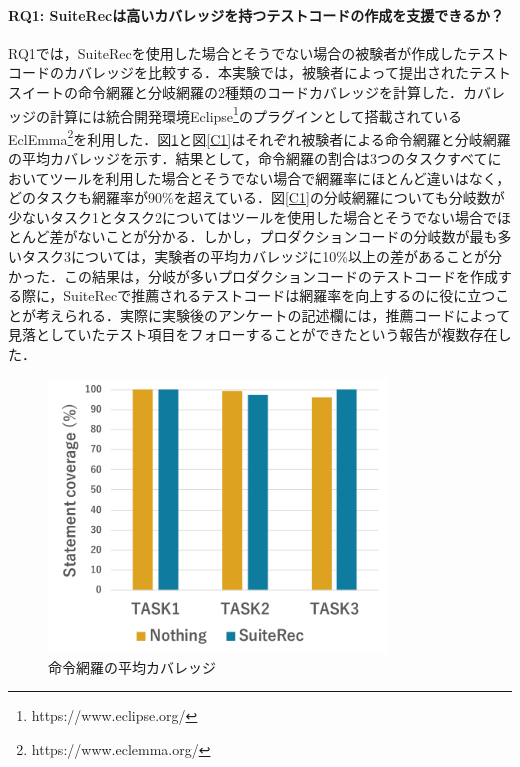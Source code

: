 \documentclass[12pt]{jarticle} %
\begin{document}
\paragraph{RQ1: {\sf SuiteRec}は高いカバレッジを持つテストコードの作成を支援できるか？}RQ1では，{\sf SuiteRec}を使用した場合とそうでない場合の被験者が作成したテストコードのカバレッジを比較する．本実験では，被験者によって提出されたテストスイートの命令網羅と分岐網羅の2種類のコードカバレッジを計算した．カバレッジの計算には統合開発環境Eclipse\footnote{https://www.eclipse.org/}のプラグインとして搭載されているEclEmma\footnote{https://www.eclemma.org/}を利用した．図\ref{C0}と図\ref{C1}はそれぞれ被験者による命令網羅と分岐網羅の平均カバレッジを示す．結果として，命令網羅の割合は3つのタスクすべてにおいてツールを利用した場合とそうでない場合で網羅率にほとんど違いはなく，どのタスクも網羅率が90\%を超えている．図\ref{C1}の分岐網羅についても分岐数が少ないタスク1とタスク2についてはツールを使用した場合とそうでない場合でほとんど差がないことが分かる．しかし，プロダクションコードの分岐数が最も多いタスク3については，実験者の平均カバレッジに10\%以上の差があることが分かった．この結果は，分岐が多いプロダクションコードのテストコードを作成する際に，{\sf SuiteRec}で推薦されるテストコードは網羅率を向上するのに役に立つことが考えられる．実際に実験後のアンケートの記述欄には，推薦コードによって見落としていたテスト項目をフォローすることができたという報告が複数存在した．

\begin{figure}[htbp]
  \begin{center}
   \includegraphics[width=9cm]{C0.pdf}
  \caption{命令網羅の平均カバレッジ}
  \label{C0}
  \end{center}
\end{figure}
\end{document}
